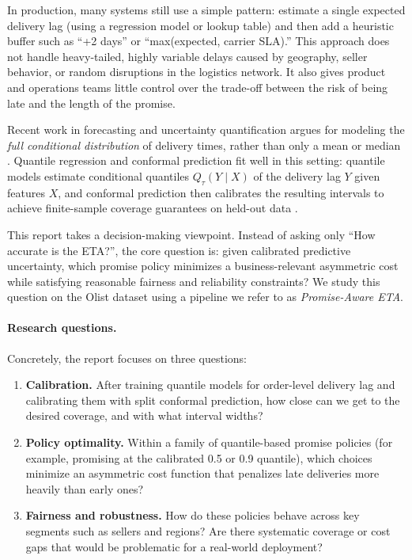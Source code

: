 \documentclass[10pt,twocolumn]{article}
\begin{document}
In production, many systems still use a simple pattern: estimate a single expected delivery lag (using a regression model or lookup table) and then add a heuristic buffer such as ``+2 days'' or ``max(expected, carrier SLA).'' This approach does not handle heavy-tailed, highly variable delays caused by geography, seller behavior, or random disruptions in the logistics network. It also gives product and operations teams little control over the trade-off between the risk of being late and the length of the promise.

Recent work in forecasting and uncertainty quantification argues for modeling the \emph{full conditional distribution} of delivery times, rather than only a mean or median \citep{koenker1978,koenker2001,lightgbm2017,zhang2023calibration}. Quantile regression and conformal prediction fit well in this setting: quantile models estimate conditional quantiles $Q_\tau(Y \mid X)$ of the delivery lag $Y$ given features $X$, and conformal prediction then calibrates the resulting intervals to achieve finite-sample coverage guarantees on held-out data \citep{romano2019conformalized,angelopoulos2021gentle}.

This report takes a decision-making viewpoint. Instead of asking only ``How accurate is the ETA?'', the core question is: given calibrated predictive uncertainty, which promise policy minimizes a business-relevant asymmetric cost while satisfying reasonable fairness and reliability constraints? We study this question on the Olist dataset \citep{olistdataset} using a pipeline we refer to as \emph{Promise-Aware ETA}.

\paragraph{Research questions.}
Concretely, the report focuses on three questions:
\begin{enumerate}
  \item \textbf{Calibration.} After training quantile models for order-level delivery lag and calibrating them with split conformal prediction, how close can we get to the desired coverage, and with what interval widths?
  \item \textbf{Policy optimality.} Within a family of quantile-based promise policies (for example, promising at the calibrated 0.5 or 0.9 quantile), which choices minimize an asymmetric cost function that penalizes late deliveries more heavily than early ones?
  \item \textbf{Fairness and robustness.} How do these policies behave across key segments such as sellers and regions? Are there systematic coverage or cost gaps that would be problematic for a real-world deployment?
\end{enumerate}
\end{document}
